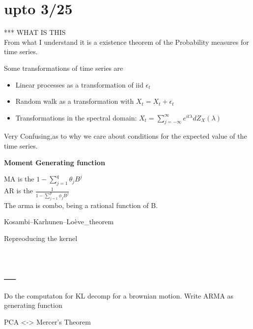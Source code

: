 \documentclass[answers,12pt,addpoints]{exam}
\begin{document}
\section{upto 3/25}

\begin{theorem}
    *** WHAT IS THIS\\
    From what I understand it is a existence theorem of the Probability measures for time series.\\
\end{theorem}
\begin{definition}
    Some transformations of time series are
   \begin{itemize}
    \item Linear processes as a transformation of iid $\epsilon_t$
    \item Random walk as a transformation with $X_t = X_t + \epsilon_t$
    \item Transformations in the spectral domain: $X_t = \sum_{j=-\infty}^{\infty} e^{it\lambda} dZ_X(\lambda)$
   \end{itemize}
\end{definition}
\begin{definition}[Section 3.3]
    Very Confusing,as to why we care about conditions for the expected value of the time series.\\
\end{definition}

\textbf{Moment Generating function}
\begin{definition}
    MA is the $1 - \sum_{j=1}^{q} \theta_j B^j$\\
    AR is the $\frac{1}{1 - \sum_{j=1}^{p} \phi_j B^j}$\\
    The arma is combo, being a rational function of B.\\
\end{definition}
\begin{definition}
    
\end{definition}


Kosambi–Karhunen–Loève_theorem

Repreoducing the kernel 


\section{_}
Do the computaton for KL decomp for a brownian motion. 
Write ARMA as generating function

PCA <-> Mercer's Theorem
\end{document}
